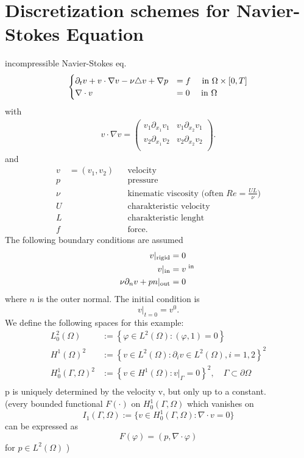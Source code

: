 \section{Discretization schemes for Navier-Stokes Equation}
incompressible Navier-Stokes eq.
\begin{align*}
	\begin{cases}
	\partial_t v + v \cdot \nabla v - \nu \triangle v + \nabla p &= f \quad \text{ in } \Omega \times [0,T]\\
	\nabla \cdot v &=0 \quad \text{ in } \Omega 
	\end{cases}
\end{align*}
with 
\begin{align*}
	v \cdot \nabla v  =
	\begin{pmatrix}
	v_1 \partial_{x_1}v_1& v_1\partial_{x_2}v_1\\
	v_2 \partial_{x_1}v_2& v_2\partial_{x_2}v_2\\
	\end{pmatrix}.
\end{align*}
and 
\begin{align*}
	v &= (v_1,v_2) && \text{velocity}\\
	p&&& \text{pressure}\\
	\nu &&& \text{kinematic viscosity (often } Re = \frac{UL}{\nu})\\
	U && &\text{charakteristic velocity}\\
	L && &\text{charakteristic lenght}\\
	f && &\text{force}.
\end{align*}
The following boundary conditions are assumed
\begin{align*}
	v|_{\text{rigid}} &= 0\\
	v|_{\text{in}} &= v^{\text{ in }}\\
	\nu \partial_nv+ pn|_{\text{out}} &=0\\
\end{align*}
where $n$ is the outer normal. The initial condition is
\begin{equation*}
	v|_{t=0}=v^0.
\end{equation*}
We define the following spaces for this example:
\begin{align*}
	L^2_0(\Omega) &:= \left \{ \varphi \in L^2(\Omega)\colon (\varphi,1)=0  \right\}\\
	H^1(\Omega)^2 &:= \left \{ v \in L^2(\Omega)\colon \partial_i v \in L^2(\Omega), i=1,2  \right\}^2\\
	H^1_0(\Gamma,\Omega)^2 &:= \left \{ v \in H^1(\Omega)\colon v|_\Gamma =0 \right\}^2, \quad \Gamma \subset \partial \Omega\\
\end{align*}
p is uniquely determined by the velocity v, but only up to a constant.\\
(every bounded functional $F(\cdot)$ on $H^1_0(\Gamma,\Omega)$ which vanishes on 
\begin{equation*}
	I_1(\Gamma,\Omega) := \{v \in H^1_0(\Gamma,\Omega)\colon \nabla\cdot v =0 \}
\end{equation*}
can be expressed as 
\begin{equation*}
	F(\varphi) = (p, \nabla \cdot \varphi)
\end{equation*}
for $p \in L^2(\Omega)$ )

